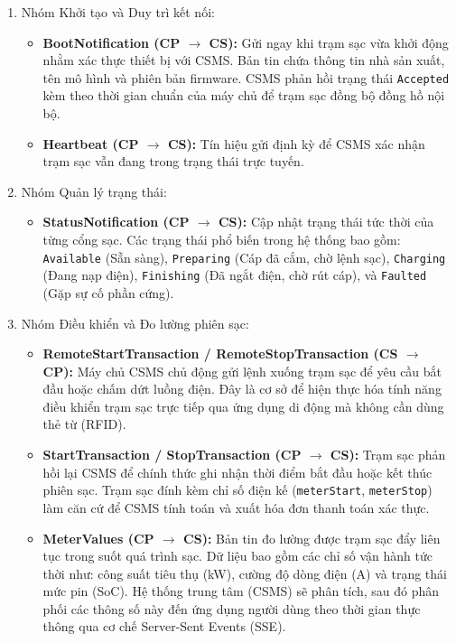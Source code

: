 \begin{enumerate}
    \item Nhóm Khởi tạo và Duy trì kết nối:
    \begin{itemize}
        \item \textbf{BootNotification (CP $\rightarrow$ CS):} Gửi ngay khi trạm sạc vừa khởi động nhằm xác thực thiết bị với CSMS. Bản tin chứa thông tin nhà sản xuất, tên mô hình và phiên bản firmware. CSMS phản hồi trạng thái \texttt{Accepted} kèm theo thời gian chuẩn của máy chủ để trạm sạc đồng bộ đồng hồ nội bộ.
        \item \textbf{Heartbeat (CP $\rightarrow$ CS):} Tín hiệu  gửi định kỳ để CSMS xác nhận trạm sạc vẫn đang trong trạng thái trực tuyến.
    \end{itemize}
    
    \item Nhóm Quản lý trạng thái:
    \begin{itemize}
        \item \textbf{StatusNotification (CP $\rightarrow$ CS):} Cập nhật trạng thái tức thời của từng cổng sạc. Các trạng thái phổ biến trong hệ thống bao gồm: \texttt{Available} (Sẵn sàng), \texttt{Preparing} (Cáp đã cắm, chờ lệnh sạc), \texttt{Charging} (Đang nạp điện), \texttt{Finishing} (Đã ngắt điện, chờ rút cáp), và \texttt{Faulted} (Gặp sự cố phần cứng).
    \end{itemize}
    
    \item Nhóm Điều khiển và Đo lường phiên sạc:
    \begin{itemize}
        \item \textbf{RemoteStartTransaction / RemoteStopTransaction (CS $\rightarrow$ CP):} Máy chủ CSMS chủ động gửi lệnh xuống trạm sạc để yêu cầu bắt đầu hoặc chấm dứt luồng điện. Đây là cơ sở để hiện thực hóa tính năng điều khiển trạm sạc trực tiếp qua ứng dụng di động mà không cần dùng thẻ từ (RFID).
        \item \textbf{StartTransaction / StopTransaction (CP $\rightarrow$ CS):} Trạm sạc phản hồi lại CSMS để chính thức ghi nhận thời điểm bắt đầu hoặc kết thúc phiên sạc. Trạm sạc đính kèm chỉ số điện kế (\texttt{meterStart}, \texttt{meterStop}) làm căn cứ để CSMS tính toán và xuất hóa đơn thanh toán xác thực.
        \item \textbf{MeterValues (CP $\rightarrow$ CS):} Bản tin đo lường được trạm sạc đẩy liên tục trong suốt quá trình sạc. Dữ liệu bao gồm các chỉ số vận hành tức thời như: công suất tiêu thụ (kW), cường độ dòng điện (A) và trạng thái mức pin (SoC). Hệ thống trung tâm (CSMS) sẽ phân tích, sau đó phân phối các thông số này đến ứng dụng người dùng theo thời gian thực thông qua cơ chế Server-Sent Events (SSE).
    \end{itemize}
\end{enumerate}

